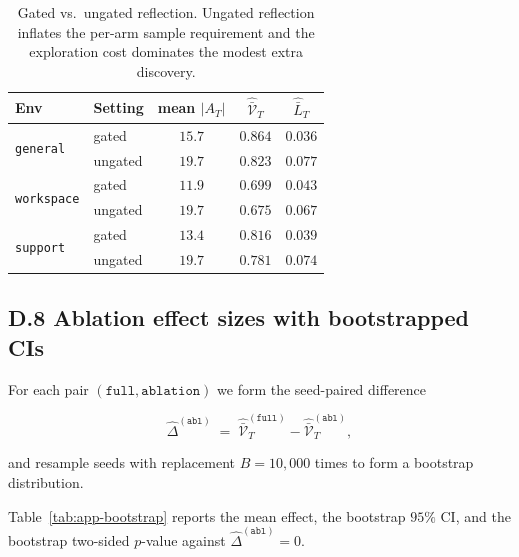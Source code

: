 \documentclass{article} %
\begin{document}
\begin{table}[h]
\centering
\small
\begin{tabular}{llccc}
\toprule
Env & Setting & mean $|A_T|$ & $\widehat{\bar{\mathcal V}}_T$ & $\widehat{\bar L}_T$ \\
\midrule
\multirow{2}{*}{\texttt{general}}
 & gated   & $15.7$ & $0.864$ & $0.036$ \\
 & ungated & $19.7$ & $0.823$ & $0.077$ \\
\midrule
\multirow{2}{*}{\texttt{workspace}}
 & gated   & $11.9$ & $0.699$ & $0.043$ \\
 & ungated & $19.7$ & $0.675$ & $0.067$ \\
\midrule
\multirow{2}{*}{\texttt{support}}
 & gated   & $13.4$ & $0.816$ & $0.039$ \\
 & ungated & $19.7$ & $0.781$ & $0.074$ \\
\bottomrule
\end{tabular}
\caption{Gated vs.\ ungated reflection. Ungated reflection inflates the per-arm sample requirement and the exploration cost dominates the modest extra discovery.}
\label{tab:app-ungated}
\end{table}

\subsection{D.8 Ablation effect sizes with bootstrapped CIs}

\label{app:tab-bootstrap}

For each pair $(\texttt{full},\texttt{ablation})$ we form the seed-paired difference

\begin{equation}
\label{eq:app-tab-effect}
\widehat\Delta^{(\texttt{abl})} \;=\; \widehat{\bar{\mathcal V}}_T^{(\texttt{full})} - \widehat{\bar{\mathcal V}}_T^{(\texttt{abl})},
\end{equation}

and resample seeds with replacement $B=10{,}000$ times to form a bootstrap distribution.

Table~\ref{tab:app-bootstrap} reports the mean effect, the bootstrap $95\%$ CI, and the bootstrap two-sided $p$-value against $\widehat\Delta^{(\texttt{abl})}=0$.
\end{document}

